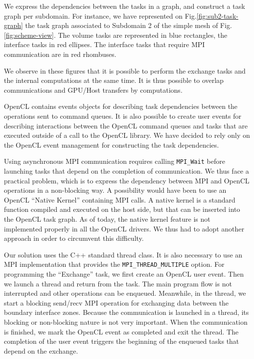 \documentclass{svmult}
\begin{document}
We express the dependencies between the tasks in a graph, and
construct a task graph per subdomain. For instance, we have
represented on Fig.\ref{fig:sub2-task-graph} the task graph associated
to Subdomain 2 of the simple mesh of Fig.\ref{fig:scheme-view}. The
volume tasks are represented in blue rectangles, the interface tasks
in red ellipses. The interface tasks that require MPI communication
are in red rhombuses.

We observe in these figures that it is possible to perform the
exchange tasks and the internal computations at the same time. It is
thus possible to overlap communications and GPU/Host transfers by
computations.

OpenCL contains events objects for describing task dependencies
between the operations sent to command queues. It is also possible to
create user events for describing interactions between the OpenCL
command queues and tasks that are executed outside of a call to the
OpenCL library. We have decided to rely only on the OpenCL event
management for constructing the task dependencies.

Using asynchronous MPI communication requires calling
\texttt{MPI\_Wait} before launching tasks that depend on the
completion of communication. We thus face a practical problem, which
is to express the dependency between MPI and OpenCL operations in a
non-blocking way. A possibility would have been to use an OpenCL
``Native Kernel'' containing MPI calls. A native kernel is a standard
function compiled and executed on the host side, but that can be
inserted into the OpenCL task graph. As of today, the native kernel
feature is not implemented properly in all the OpenCL drivers. We thus
had to adopt another approach in order to circumvent this difficulty.

Our solution uses the C++ standard thread class. It is also necessary
to use an MPI implementation that provides the
\texttt{MPI\_THREAD\_MULTIPLE} option.  For programming the
``Exchange'' task, we first create an OpenCL user event.  Then we
launch a thread and return from the task.  The main program flow is
not interrupted and other operations can be enqueued. Meanwhile, in
the thread, we start a blocking send/recv MPI operation for exchanging
data between the boundary interface zones.  Because the communication
is launched in a thread, its blocking or non-blocking nature is not
very important.  When the communication is finished, we mark the
OpenCL event as completed and exit the thread.  The completion of the
user event triggers the beginning of the enqueued tasks that depend on
the exchange.
\end{document}
